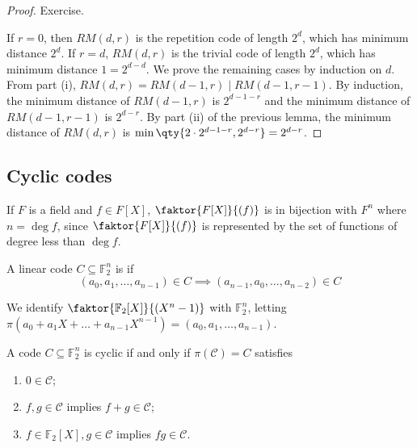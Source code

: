 \begin{proof}
    Exercise.

    If $r = 0$, then $RM(d,r)$ is the repetition code of length $2^d$, which has minimum distance $2^d$.
    If $r = d$, $RM(d,r)$ is the trivial code of length $2^d$, which has minimum distance $1 = 2^{d-d}$.
    We prove the remaining cases by induction on $d$.
    From part (i), $RM(d,r) = RM(d-1,r) \mid RM(d-1,r-1)$.
    By induction, the minimum distance of $RM(d-1,r)$ is $2^{d-1-r}$ and the minimum distance of $RM(d-1,r-1)$ is $2^{d-r}$.
    By part (ii) of the previous lemma, the minimum distance of $RM(d,r)$ is $\min\qty{2\cdot 2^{d-1-r}, 2^{d-r}} = 2^{d-r}$.
\end{proof}

\subsection{Cyclic codes}
If $F$ is a field and $f \in F[X]$, $\faktor{F[X]}{(f)}$ is in bijection with $F^n$ where $n = \deg f$, since $\faktor{F[X]}{(f)}$ is represented by the set of functions of degree less than $\deg f$.
\begin{definition}
    A linear code $C \subseteq \mathbb F_2^n$ is  if
    \[ (a_0, a_1, \dots, a_{n-1}) \in C \implies (a_{n-1}, a_0, \dots, a_{n-2}) \in C \]
\end{definition}
We identify $\faktor{\mathbb F_2[X]}{(X^n - 1)}$ with $\mathbb F_2^n$, letting $\pi(a_0 + a_1X + \dots + a_{n-1}X^{n-1}) = (a_0, a_1, \dots, a_{n-1})$.
\begin{lemma}
    A code $C \subseteq \mathbb F_2^n$ is cyclic if and only if $\pi(\mathcal C) = C$ satisfies
    \begin{enumerate}
        \item $0 \in \mathcal C$;
        \item $f, g \in \mathcal C$ implies $f + g \in \mathcal C$;
        \item $f \in \mathbb F_2[X], g \in \mathcal C$ implies $fg \in \mathcal C$.
    \end{enumerate}
\end{lemma}
